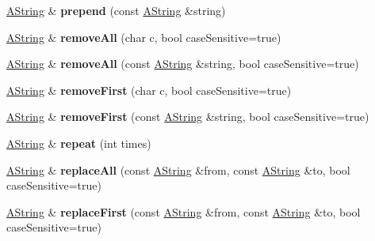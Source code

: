 \begin{DoxyCompactItemize}
\item 
\mbox{\label{class_a_string_a0835a8afa3a490196003c11e23653e4a}} 
\mbox{\hyperlink{class_a_string}{A\+String}} \& {\bfseries prepend} (const \mbox{\hyperlink{class_a_string}{A\+String}} \&string)
\item 
\mbox{\label{class_a_string_aa5449e9044b69fa7987139d32981b374}} 
\mbox{\hyperlink{class_a_string}{A\+String}} \& {\bfseries remove\+All} (char c, bool case\+Sensitive=true)
\item 
\mbox{\label{class_a_string_a4b4c9d14b53ed0dce8314d7d14755d8b}} 
\mbox{\hyperlink{class_a_string}{A\+String}} \& {\bfseries remove\+All} (const \mbox{\hyperlink{class_a_string}{A\+String}} \&string, bool case\+Sensitive=true)
\item 
\mbox{\label{class_a_string_a5fe11f844aa85e053fbf0bedc18cd557}} 
\mbox{\hyperlink{class_a_string}{A\+String}} \& {\bfseries remove\+First} (char c, bool case\+Sensitive=true)
\item 
\mbox{\label{class_a_string_af7ef7985f65cfab4b67b5772717f7496}} 
\mbox{\hyperlink{class_a_string}{A\+String}} \& {\bfseries remove\+First} (const \mbox{\hyperlink{class_a_string}{A\+String}} \&string, bool case\+Sensitive=true)
\item 
\mbox{\label{class_a_string_a04bdc2e3cdfe637d2e5754227677eea1}} 
\mbox{\hyperlink{class_a_string}{A\+String}} \& {\bfseries repeat} (int times)
\item 
\mbox{\label{class_a_string_a53703f2b13b21435e7cdadc4fd1a7015}} 
\mbox{\hyperlink{class_a_string}{A\+String}} \& {\bfseries replace\+All} (const \mbox{\hyperlink{class_a_string}{A\+String}} \&from, const \mbox{\hyperlink{class_a_string}{A\+String}} \&to, bool case\+Sensitive=true)
\item 
\mbox{\label{class_a_string_af28290e59b97962a365e89e475376ac7}} 
\mbox{\hyperlink{class_a_string}{A\+String}} \& {\bfseries replace\+First} (const \mbox{\hyperlink{class_a_string}{A\+String}} \&from, const \mbox{\hyperlink{class_a_string}{A\+String}} \&to, bool case\+Sensitive=true)
\item 

\end{DoxyCompactItemize}
